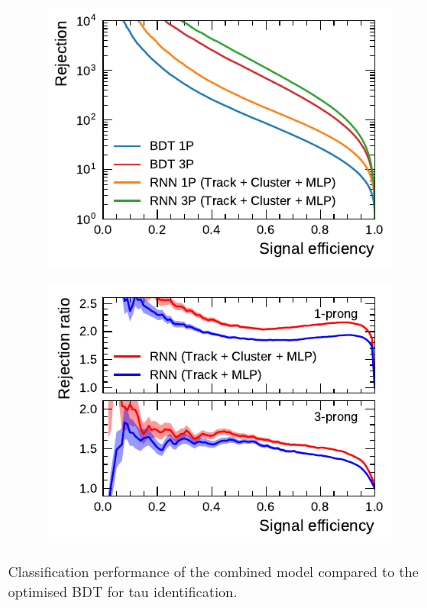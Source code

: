 \begin{figure}[htb]
  \begin{subfigure}[t]{0.48\textwidth}
    \centering
    \includegraphics{./figures/rnn/combined/roc.pdf}
  \end{subfigure}\hfill
  \begin{subfigure}[t]{0.48\textwidth}
    \centering
    \includegraphics{./figures/rnn/combined/ratios.pdf}
  \end{subfigure}
  \caption{Classification performance of the combined model compared to the
    optimised BDT for tau identification.}
  \label{fig:roc_combined}
\end{figure}

